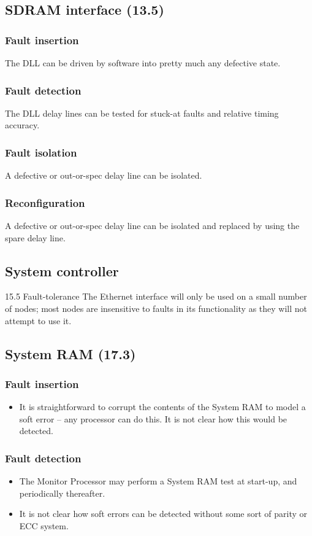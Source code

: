 \documentclass[12pt]{article}
\newenvironment{itmz}{
	\begin{itemize}
		\setlength{\itemsep}{0pt}
		\setlength{\parskip}{0pt}
	}{\end{itemize}}
\begin{document}
\subsection{SDRAM interface (13.5)}
\subsubsection*{Fault insertion}
The DLL can be driven by software into pretty much any defective state.
\subsubsection*{Fault detection}
The DLL delay lines can be tested for stuck-at faults and relative timing accuracy.
\subsubsection*{Fault isolation}
A defective or out-or-spec delay line can be isolated.
\subsubsection*{Reconfiguration}
A defective or out-or-spec delay line can be isolated and replaced by using the spare delay line.

\subsection{System controller}
15.5 Fault-tolerance
The Ethernet interface will only be used on a small number of nodes; most nodes are insensitive to
faults in its functionality as they will not attempt to use it.

\subsection{System RAM (17.3)}
\subsubsection*{Fault insertion}
\begin{itmz}
\item It is straightforward to corrupt the contents of the System RAM to model a soft error -- any processor can do this. It is not clear how this would be detected.
\end{itmz}
\subsubsection*{Fault detection}
\begin{itmz}
\item The Monitor Processor may perform a System RAM test at start-up, and periodically thereafter.
\item It is not clear how soft errors can be detected without some sort of parity or ECC system.
\end{itmz}
\end{document}

